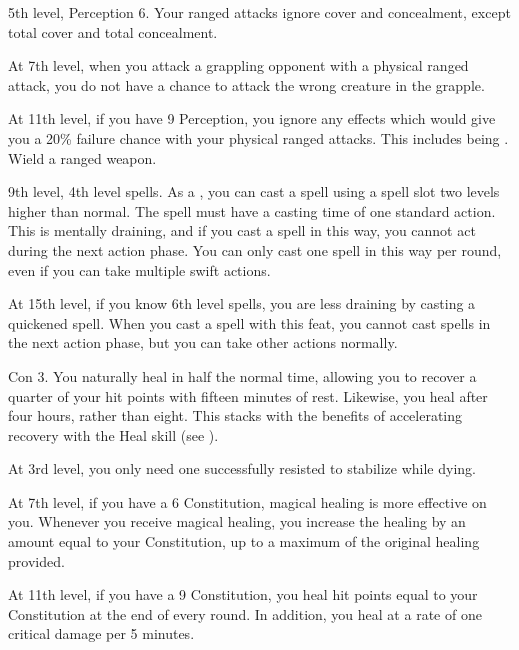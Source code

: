     \featpres 5th level, Perception 6.
    \featben Your ranged attacks ignore cover and concealment, except total cover and total concealment.

    At 7th level, when you attack a grappling opponent with a physical ranged attack, you do not have a chance to attack the wrong creature in the grapple.

    At 11th level, if you have 9 Perception, you ignore any effects which would give you a 20\% failure chance with your physical ranged attacks.
    This includes being \impaired.
    \stylereq Wield a ranged weapon.

    \featpre 9th level, 4th level spells.
    \featben As a , you can cast a spell using a spell slot two levels higher than normal.
    The spell must have a casting time of one standard action.
    This is mentally draining, and if you cast a spell in this way, you cannot act during the next action phase.
    You can only cast one spell in this way per round, even if you can take multiple swift actions.

    At 15th level, if you know 6th level spells, you are less draining by casting a quickened spell.
    When you cast a spell with this feat, you cannot cast spells in the next action phase, but you can take other actions normally.

    \featpre Con 3.
    \featben You naturally heal in half the normal time, allowing you to recover a quarter of your hit points with fifteen minutes of rest.
    Likewise, you heal  after four hours, rather than eight.
    This stacks with the benefits of accelerating recovery with the Heal skill (see ).

    At 3rd level, you only need one successfully resisted  to stabilize while dying.

    At 7th level, if you have a 6 Constitution, magical healing is more effective on you.
    Whenever you receive magical healing, you increase the healing by an amount equal to your Constitution, up to a maximum of the original healing provided.

    At 11th level, if you have a 9 Constitution, you heal hit points equal to your Constitution at the end of every round.
    In addition, you heal  at a rate of one critical damage per 5 minutes.


